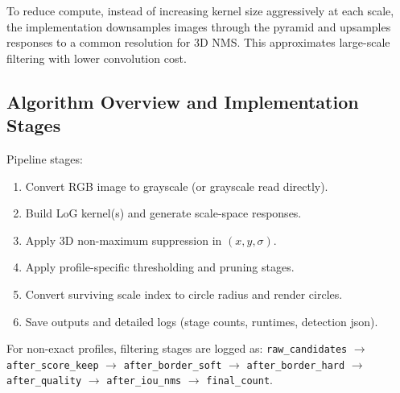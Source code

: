 {To reduce compute, instead of increasing kernel size aggressively at each scale, the implementation downsamples images through the pyramid and upsamples responses to a common resolution for 3D NMS. This approximates large-scale filtering with lower convolution cost.

\subsection*{Algorithm Overview and Implementation Stages}
\label{sec:p2-overview}
Pipeline stages:
\begin{enumerate}
\item Convert RGB image to grayscale (or grayscale read directly).
\item Build LoG kernel(s) and generate scale-space responses.
\item Apply 3D non-maximum suppression in $(x,y,\sigma)$.
\item Apply profile-specific thresholding and pruning stages.
\item Convert surviving scale index to circle radius and render circles.
\item Save outputs and detailed logs (stage counts, runtimes, detection json).
\end{enumerate}

For non-exact profiles, filtering stages are logged as:
\texttt{raw\_candidates} $\rightarrow$ \texttt{after\_score\_keep} $\rightarrow$ \texttt{after\_border\_soft} $\rightarrow$ \texttt{after\_border\_hard} $\rightarrow$ \texttt{after\_quality} $\rightarrow$ \texttt{after\_iou\_nms} $\rightarrow$ \texttt{final\_count}.

}
